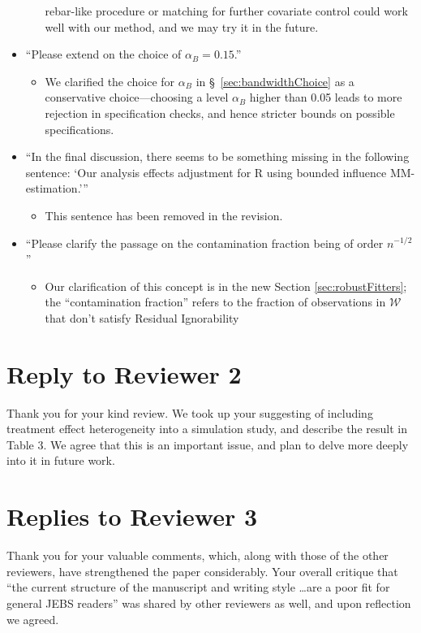 \documentclass[12pt]{article}
\begin{document}
\begin{itemize}
\begin{itemize}
     rebar-like procedure or matching for further covariate control
     could work well with our method, and we may try it in the
     future.
  \end{itemize}
\item ``Please extend on the choice of $\alpha_B=0.15$.''
\begin{itemize}
 \item We clarified the choice for $\alpha_B$ in
   \S~\ref{sec:bandwidthChoice} as a
   conservative choice---choosing a level $\alpha_B$ higher than 0.05
   leads to more rejection in specification checks, and hence stricter
   bounds on possible specifications.
\end{itemize}
\item ``In the final discussion, there seems to be something missing in
  the following sentence: `Our analysis effects adjustment for R using
  bounded influence MM- estimation.'''
\begin{itemize}
\item This sentence has been removed in the revision.
\end{itemize}
\item ``Please clarify the passage on the contamination fraction being of
order $n^{-1/2}$''
\begin{itemize}
 \item Our clarification of this concept is in the new Section \ref{sec:robustFitters};
   the ``contamination fraction'' refers to the fraction of
   observations in $\mathcal{W}$ that don't satisfy Residual
   Ignorability
\end{itemize}
\end{itemize}

\section{Reply to Reviewer 2}

Thank you for your kind review. We took up your suggesting of
including treatment effect heterogeneity into a simulation study,
and describe the result in Table 3. We agree that this is an important
issue, and plan to delve more deeply into it in future work.



\section{Replies to Reviewer 3}
Thank you for your valuable comments, which, along with those of the
other reviewers, have strengthened the paper considerably. Your
overall critique that ``the current structure of the manuscript
and writing style \dots are a poor fit for general JEBS readers'' was
shared by other reviewers as well, and upon reflection we agreed.
\end{document}
